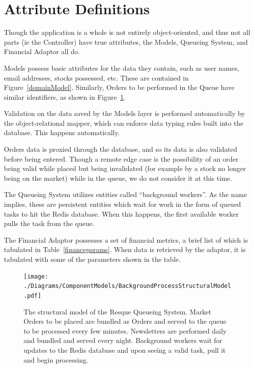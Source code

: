 \section{Attribute Definitions}

Though the application is a whole is not entirely object-oriented,
and thus not all parts (ie the Controller) have true attributes,
the Models, Queueing System, and Financial Adaptor all do. 

Models possess basic attributes for the data they contain, such
as user names, email addresses, stocks possessed, etc. These are
contained in Figure~\ref{domainModel}.  Similarly, Orders to
be performed in the Queue have similar identifiers, as shown in 
Figure~\ref{queuestruct}.

Validation on the data saved by the Models layer is performed 
automatically by the object-relational mapper, which can enforce
data typing rules built into the database. This happens automatically.

Orders data is proxied through the database, and so its data is also
validated before being entered. Though a remote edge case is the 
possibility of an order being valid while placed but being invalidated
(for example by a stock no longer being on the market) while in the
queue, we do not consider it at this time.

The Queueing System utilizes entities called ``background workers''.
As the name implies, these are persistent entities which wait
for work in the form of queued tasks to hit the Redis database. When
this happens, the first available worker pulls the task from the queue.

The Financial Adaptor possesses a set of financial metrics, a brief
list of which is tabulated in Table~\ref{financeparams}. When
data is retrieved by the adaptor, it is tabulated with some of the
parameters shown in the table.


\begin{figure}
\label{queuestruct}
\centering
\texttt{[image: ./Diagrams/ComponentModels/BackgroundProcessStructuralModel.pdf]}
\caption{The structural model of the Resque Queueing System. Market Orders to be placed are 
bundled as Orders and served to the queue to be processed every few minutes. Newsletters are 
performed daily and bundled and served every night. Background workers wait for updates to
the Redis database and upon seeing a valid task, pull it and begin processing.}
\end{figure}

